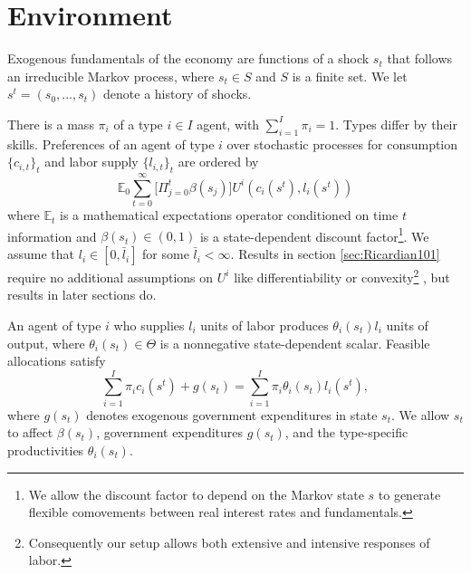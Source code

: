 \documentclass[thmsb,11pt]{article}
\begin{document}



\section{Environment\label{Sec: environment}}

\smallskip  %
Exogenous fundamentals
of the
economy are  functions of a shock  $s_{t}$  that follows an irreducible Markov process, where $s_{t}\in S$ and $S$ is a finite set. We let $s^{t}=\left(
s_{0},...,s_{t}\right) $ denote a history of shocks.

There is a mass $\pi _{i}$
of a type $i\in I$ agent, with $\sum_{i=1}^{I}\pi _{i}=1.$ Types differ by their skills.
Preferences of an
agent of type $i$ over stochastic processes for consumption $\{c_{i,t}\}_t$
and labor supply $\{l_{i,t}\}_t$ are ordered by
\begin{equation}
\mathbb{E}_{0}\sum_{t=0}^{\infty } \bigl[\Pi_{j=0}^t \beta(s_j)\bigr] U^{i}\left(
c_{i}(s^t),l_{i}(s^t)\right)  \label{utility lifetime}
\end{equation}%
where $\mathbb{E}_{t}$ is a mathematical expectations operator conditioned
on time $t$ information and $\beta(s_t) \in \left( 0,1\right) $ is a state-dependent discount
factor\footnote{We allow the discount factor to depend on the Markov state $s$ to generate flexible  comovements between real interest rates and fundamentals. }. We assume that $l_{i}\in \left[ 0,\bar{l}_{i}\right] $ for some $%
\bar{l}_{i}<\infty .$ Results in section  \ref{sec:Ricardian101} require no
additional assumptions on $U^{i}$ like  differentiability or convexity\footnote{Consequently  our setup allows both extensive and intensive responses of labor.} , but results in later sections do.

An agent of type $i$ who supplies $l_{i}$ units of labor produces $\theta
_{i}\left( s_t\right) l_{i}$ units of output, where $\theta _{i}(s_t)\in \Theta $
is a nonnegative state-dependent scalar. Feasible allocations satisfy
\begin{equation}%
\sum_{i=1}^{I}\pi_{i}c_{i}(s^t)+g\left( s_{t}\right) =\sum_{i=1}^{I}\pi
_{i}\theta _{i}\left( s_{t}\right) l_{i}(s^t),  \label{feasibility goods}
\end{equation}%
where $g\left( s_{t}\right) $ denotes exogenous government expenditures in
state $s_{t}.$
 We allow $s_t$ to
affect $\beta(s_t)$, government expenditures $g(s_t)$, and the type-specific productivities $\theta_i(s_t)$.
\end{document}
